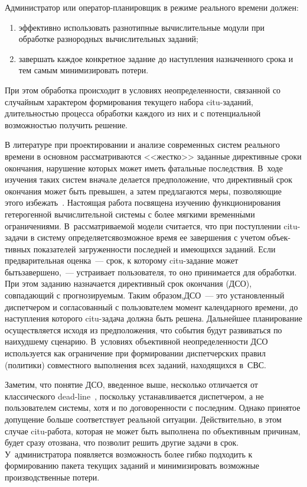 \begin{multicols}{2}
Администратор или опе\-ра\-тор-пла\-ни\-ров\-щик в режиме реального времени должен:
\begin{enumerate}[(1)]
\item эффективно использовать разнотипные вы\-чис\-ли\-тель\-ные модули при обработке разнородных вычислительных заданий;
\item завершать каж\-дое конкретное  задание  до наступления назначенного срока и тем самым минимизировать потери.
\end{enumerate}
При этом обработка происходит в условиях неопределенности, связанной
со случайным характером формирования текущего набора citu-за\-да\-ний,
длительностью процесса обработки каж\-до\-го из них и с потенциальной
возможностью получить решение.

В литературе при проектировании и анализе современных сис\-тем
реального времени  в основном рассматриваются <<жестко>> заданные
директивные сроки окончания, нарушение которых может иметь фатальные
последствия. В~ходе изучения таких систем вначале делается
предположение, что  директивный срок окончания может быть превышен,
а затем предлагаются меры, позволяющие этого избежать~\cite{RT2004}.
Настоящая работа посвящена изучению функционирования гетерогенной
вычислительной системы с более мягкими временн$\acute{\mbox{ы}}$ми ограничениями. 
В~рас\-смат\-ри\-ва\-емой модели считается, что при поступлении citu-за\-да\-чи в
систему  определяется\linebreak возможное время ее завершения с учетом
объек-\linebreak тивных показателей  загруженности последней и имеющихся
заданий. Если предварительная оценка~--- срок, к которому
citu-за\-да\-ние может быть\linebreak завершено,~--- устраивает пользователя, то
оно принима\-ется для обработки. При этом заданию на\-зна\-ча\-ет\-ся
директивный срок окончания (ДСО), совпада\-ющий с прогнозируемым. Таким
образом,\linebreak ДСО~--- это уста\-нов\-лен\-ный
диспетчером и согласованный с пользователем момент календарного\linebreak
времени, до наступления которого citu-за\-да\-ча должна быть решена.
Дальнейшее планирование осуществляется исходя из предположения, что
события будут развиваться по наихудшему сценарию. В~условиях
объективной неопределенности  ДСО  используется как ограничение при
формировании диспетчерских правил (политики) совместного выполнения
всех заданий, находящихся  в~СВС.

Заметим, что понятие ДСО, введенное выше, несколько отличается от
классического dead-line~\cite{Stan}, поскольку устанавливается
диспетчером, а не пользователем сис\-те\-мы, хотя и по договоренности с
последним. Однако принятое допущение больше соответствует реальной
ситуации. Действительно, в этом случае citu-ра\-бо\-та, которая не может
быть выполнена по объективным причинам, будет сразу отозвана, что
позволит решить другие задачи в срок. У~администратора появляется
возможность более гибко подходить к формированию пакета текущих
заданий и минимизировать возможные производственные потери.


\end{multicols}
